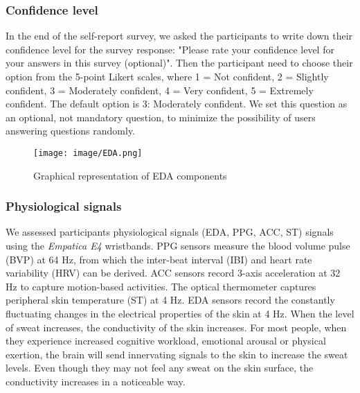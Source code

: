 \documentclass[sigconf]{acmart}
\begin{document}
\subsubsection{Confidence level} In the end of the self-report survey, we asked the participants to write down their confidence level for the survey response: "Please rate your confidence level for your answers in this survey (optional)". Then the participant need to choose their option from the 5-point Likert scales, where 1 = Not confident, 2 = Slightly confident, 3 = Moderately confident, 4 = Very confident, 5 = Extremely confident. The default option is 3: Moderately confident. We set this question as an optional, not mandatory question, to minimize the possibility of users answering questions randomly. 


\begin{figure}
    \centering
    \texttt{[image: image/EDA.png]}
    \caption{Graphical representation of EDA components}
    \label{fig:edaexample}
\end{figure}

\subsubsection{Physiological signals}

We assessed participants physiological signals (EDA, PPG, ACC, ST) signals using the \textit{Empatica E4} wristbands. PPG sensors measure the blood volume pulse (BVP) at 64 Hz, from which the inter-beat interval (IBI) and heart rate variability (HRV) can be derived. ACC sensors record 3-axis acceleration at 32 Hz to capture motion-based activities. The optical thermometer captures peripheral skin temperature (ST) at 4 Hz.
EDA sensors record the constantly fluctuating changes in the electrical properties of the skin at 4 Hz. When the level of sweat increases, the conductivity of the skin increases. For most people, when they experience increased cognitive workload, emotional arousal or physical exertion, the brain will send innervating signals to the skin to increase the sweat levels. Even though they may not feel any sweat on the skin surface, the conductivity increases in a noticeable way. 
\end{document}
